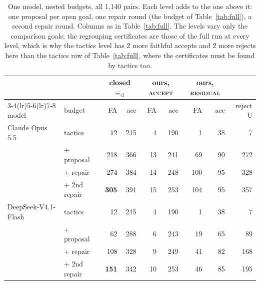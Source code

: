 \documentclass[10pt]{article}
\theoremstyle{definition}
\newcommand{\Ecl}{\mathrel{\equiv_{\mathrm{cl}}}}
\newcommand{\V}[1]{\textsc{#1}}
\begin{document}
\begin{table}[t]
\centering\small
\begin{tabular}{llrrrrrrr}
\toprule
& & \multicolumn{2}{c}{closed $\Ecl$} & \multicolumn{2}{c}{ours, \V{accept}} & \multicolumn{2}{c}{ours, \V{residual}} & \\
\cmidrule(lr){3-4}\cmidrule(lr){5-6}\cmidrule(lr){7-8}
model & budget & FA & acc & FA & acc & FA & acc & reject U\\
\midrule
Claude Opus 5.5 & tactics & 12 & 215 & 4 & 190 & 1 & 38 & 7\\
 & + proposal & 218 & 366 & 13 & 241 & 69 & 90 & 272\\
 & + repair & 274 & 384 & 14 & 248 & 100 & 95 & 328\\
 & + 2nd repair & \textbf{305} & 391 & 15 & 253 & 104 & 95 & 357\\
DeepSeek-V4.1-Flash & tactics & 12 & 215 & 4 & 190 & 1 & 38 & 7\\
 & + proposal & 62 & 288 & 6 & 243 & 19 & 65 & 89\\
 & + repair & 108 & 328 & 9 & 249 & 41 & 82 & 168\\
 & + 2nd repair & \textbf{151} & 342 & 10 & 253 & 46 & 85 & 195\\
\bottomrule
\end{tabular}
\caption{One model, nested budgets, all 1,140 pairs. Each level adds to the one above it: one
proposal per open goal, one repair round (the budget of Table~\ref{tab:full}), a second repair
round. Columns as in Table~\ref{tab:full}. The levels vary only the comparison goals; the
regrouping certificates are those of the full run at every level, which is why the tactics level
has 2 more faithful accepts and 2 more rejects here than the tactics row of Table~\ref{tab:full}, where the
certificates must be found by tactics too.}
\label{tab:budget}
\end{table}
\end{document}
